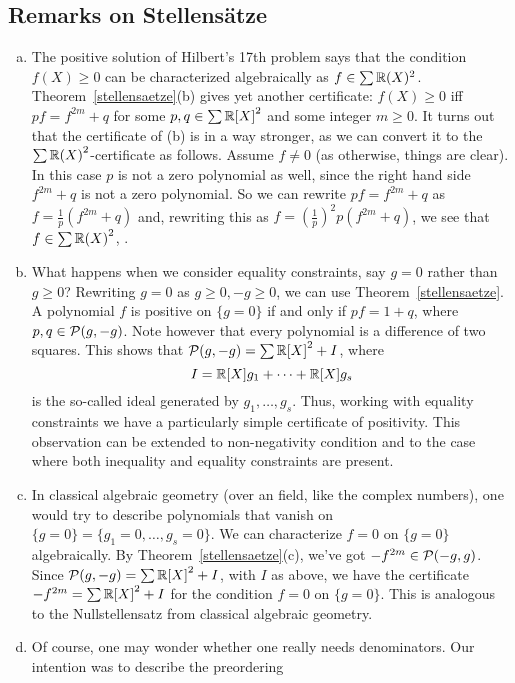 \subsection{Remarks on Stellensätze}

	\begin{enumerate}[(a)]
		\item The positive solution of Hilbert's 17th problem says that the condition $f(X) \ge 0$ can be characterized algebraically as $f \in \sum \mathbb{R}(X)^2$. Theorem~\ref{stellensaetze}(b) gives yet another certificate: $f(X) \ge 0$ iff $p f = f^{2m} + q$ for some $p, q \in \sum {\mathbb{R}[X]}^2$ and some integer $m \ge 0$. It turns out that the certificate of (b) is in a way stronger, as we can convert it to the $\sum {\mathbb{R}(X)}^2$-certificate as follows. Assume $f \ne 0$ (as otherwise, things are clear). In this case $p$ is not a zero polynomial as well, since the right hand side $f^{2m} + q$ is not a zero polynomial. So we can rewrite $p f = f^{2m}+ q$ as $f = \frac{1}{p} (f^{2m} + q)$ and, rewriting this as $f = (\frac{1}{p})^2 p ( f^{2m} + q)$, we see that $f \in \sum {\mathbb{R}(X)}^2$, .
		\item What happens when we consider equality constraints, say $g=0$ rather than $g \ge 0$? Rewriting $g=0$ as $g \ge 0, -g \ge 0$, we can use Theorem~\ref{stellensaetze}. A polynomial $f$ is positive on $\{g=0\}$ if and only if $p f = 1+q$, where $p,q \in \mathcal{P}(g,-g)$. Note however that every polynomial is a difference of two squares. This shows that $\mathcal{P}(g,-g) = \sum {\mathbb{R}[X]}^2 + I$, where
		\[
			I = \mathbb{R}[X] g_1 + \cdots + \mathbb{R}[X] g_s
		\]
		is the so-called ideal generated by $g_1,\ldots,g_s$. Thus, working with equality constraints we have a particularly simple certificate of positivity. This observation can be extended to non-negativity condition and to the case where both inequality and equality constraints are present. 
		\item In classical algebraic geometry (over an  field, like the complex numbers), one would try to describe polynomials that vanish on $\{g=0\} = \{g_1=0,\ldots,g_s=0\}$. We can characterize  $f=0$ on $\{g=0\}$ algebraically. By Theorem~\ref{stellensaetze}(c), we've got $-f^{2m} \in \mathcal{P}(-g,g)$. Since $\mathcal{P}(g,-g) = \sum {\mathbb{R}[X]}^2 +I$, with $I$ as above, we have the certificate $-f^{2m} = \sum {\mathbb{R}[X]}^2 +I$ for the condition $f = 0$ on $\{g=0\}$. This is analogous to the Nullstellensatz from classical algebraic geometry. 
		\item Of course, one may wonder whether one really needs denominators. Our  intention was to describe the preordering 

\end{enumerate}
